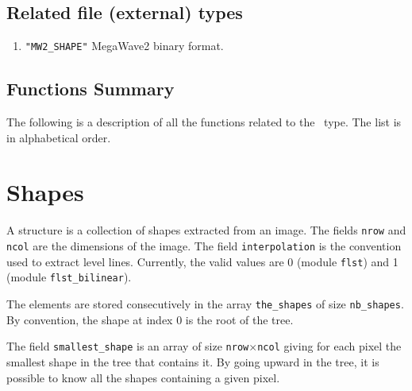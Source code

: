 \subsection{Related file (external) types}
\label{shape-file_type}

\begin{enumerate}
\item \verb+"MW2_SHAPE"+ MegaWave2 binary format.
\end{enumerate}

\subsection{Functions Summary}
\label{shape_function}

The following is a description of all the functions related to 
the \shape\ type. The list is in alphabetical order.

\newpage %



\section{Shapes}


\label{shapes}

A \shapes{} structure is a collection of shapes extracted from an image. 
The fields \verb+nrow+ and \verb+ncol+ are the dimensions of the image. 
The field \verb+interpolation+ is the convention used to extract level
lines. Currently, the valid values are 0 (module \verb+flst+) and 1 (module
\verb+flst_bilinear+).

The elements are stored consecutively in the array \verb+the_shapes+ of size
\verb+nb_shapes+. By convention, the shape at index 0 is the root of the
tree.

The field \verb+smallest_shape+ is an array of size
\verb+nrow+$\times$\verb+ncol+ giving for each pixel the smallest shape in
the tree that contains it. By going upward in the tree, it is possible to know
all the shapes containing a given pixel.

